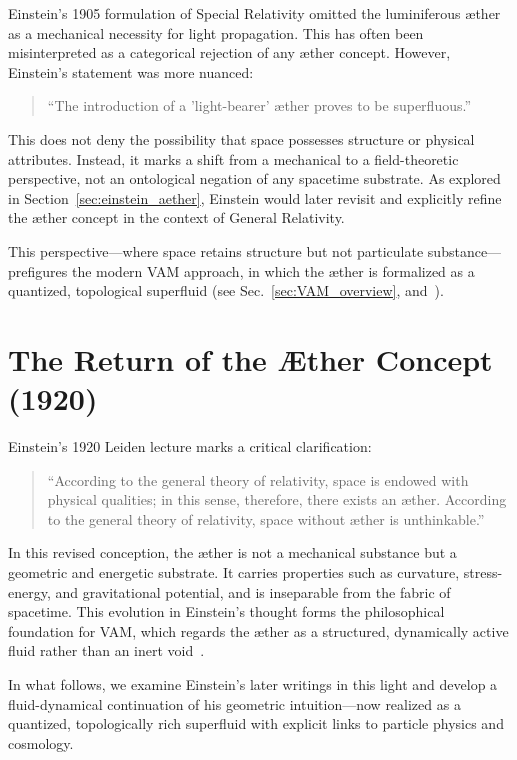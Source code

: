Einstein’s 1905 formulation of Special Relativity omitted the luminiferous æther as a mechanical necessity for light propagation. This has often been misinterpreted as a categorical rejection of any æther concept. However, Einstein’s statement was more nuanced:
\begin{quote}
    ``The introduction of a 'light-bearer' æther proves to be superfluous.''
\end{quote}

This does not deny the possibility that space possesses structure or physical attributes. Instead, it marks a shift from a mechanical to a field-theoretic perspective, not an ontological negation of any spacetime substrate. As explored in Section~\ref{sec:einstein_aether}, Einstein would later revisit and explicitly refine the æther concept in the context of General Relativity.

This perspective—where space retains structure but not particulate substance—prefigures the modern VAM approach, in which the æther is formalized as a quantized, topological superfluid (see Sec.~\ref{sec:VAM_overview}, and~\cite{VAM-8}).

\section{The Return of the Æther Concept (1920)}

Einstein’s 1920 Leiden lecture marks a critical clarification:
\begin{quote}
    ``According to the general theory of relativity, space is endowed with physical qualities; in this sense, therefore, there exists an æther. According to the general theory of relativity, space without æther is unthinkable.''~\cite{einstein1920aether}
\end{quote}

In this revised conception, the æther is not a mechanical substance but a geometric and energetic substrate. It carries properties such as curvature, stress-energy, and gravitational potential, and is inseparable from the fabric of spacetime. This evolution in Einstein’s thought forms the philosophical foundation for VAM, which regards the æther as a structured, dynamically active fluid rather than an inert void~\cite{VAM-8}.

In what follows, we examine Einstein’s later writings in this light and develop a fluid-dynamical continuation of his geometric intuition—now realized as a quantized, topologically rich superfluid with explicit links to particle physics and cosmology.

